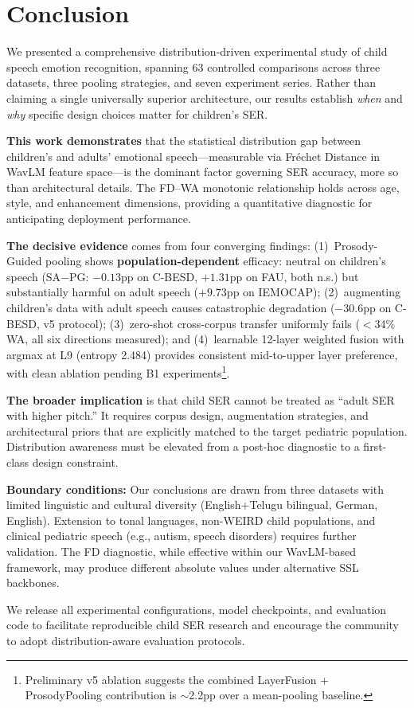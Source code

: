 
\section{Conclusion}
\label{sec:conclusion}

We presented a comprehensive distribution-driven experimental study of child
speech emotion recognition, spanning 63 controlled comparisons across three
datasets, three pooling strategies, and seven experiment series. Rather than
claiming a single universally superior architecture, our results establish
\textit{when} and \textit{why} specific design choices matter for children's
SER.

\textbf{This work demonstrates} that the statistical distribution gap between
children's and adults' emotional speech---measurable via Fr\'{e}chet Distance
in WavLM feature space---is the dominant factor governing SER accuracy, more
so than architectural details. The FD--WA monotonic relationship holds across
age, style, and enhancement dimensions, providing a quantitative diagnostic for
anticipating deployment performance.

\textbf{The decisive evidence} comes from four converging findings:
(1)~Prosody-Guided pooling shows \textbf{population-dependent} efficacy: neutral
on children's speech (SA$-$PG: $-0.13$pp on C-BESD, $+1.31$pp on FAU, both
n.s.) but substantially harmful on adult speech ($+9.73$pp on IEMOCAP);
(2)~augmenting children's data with adult speech causes catastrophic degradation
($-30.6$pp on C-BESD, v5 protocol);
(3)~zero-shot cross-corpus transfer uniformly fails ($<$34\% WA, all six
directions measured); and
(4)~learnable 12-layer weighted fusion with argmax at L9 (entropy 2.484) provides
consistent mid-to-upper layer preference, with clean ablation pending B1
experiments\footnote{Preliminary v5 ablation suggests the combined LayerFusion +
ProsodyPooling contribution is $\sim$2.2pp over a mean-pooling baseline.}.

\textbf{The broader implication} is that child SER cannot be treated as
``adult SER with higher pitch.'' It requires corpus design, augmentation
strategies, and architectural priors that are explicitly matched to the target
pediatric population. Distribution awareness must be elevated from a
post-hoc diagnostic to a first-class design constraint.

\textbf{Boundary conditions:} Our conclusions are drawn from three datasets
with limited linguistic and cultural diversity (English+Telugu bilingual, German, English).
Extension to tonal languages, non-WEIRD child populations, and clinical
pediatric speech (e.g., autism, speech disorders) requires further validation.
The FD diagnostic, while effective within our WavLM-based framework, may
produce different absolute values under alternative SSL backbones.

We release all experimental configurations, model checkpoints, and evaluation
code to facilitate reproducible child SER research and encourage the community
to adopt distribution-aware evaluation protocols.
